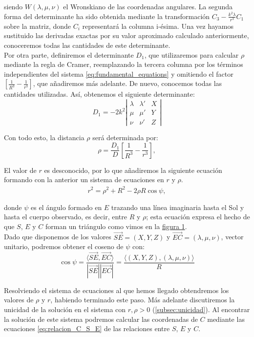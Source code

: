 \documentclass[11pt]{article}
\begin{document}
\noindent siendo $W(\lambda,\mu,\nu)$ el Wronskiano de las coordenadas angulares. La segunda forma del determinante ha sido obtenida mediante la transformación $C_3-\frac{k^2\lambda}{r^3}C_1$ sobre la matriz, donde $C_i$ representará la columna i-ésima. Una vez hayamos sustituido las derivadas exactas por su valor aproximado calculado anteriormente, conoceremos todas las cantidades de este determinante.\\

Por otra parte, definiremos el determinante $D_1$, que utilizaremos para calcular $\rho$ mediante la regla de Cramer, reemplazando la tercera columna por los términos independientes del sistema \eqref{eq:fundamental_equations} y omitiendo el factor $[\frac{1}{R^3}-\frac{1}{r^3}]$, que añadiremos más adelante. De nuevo, conocemos todas las cantidades utilizadas. Así, obtenemos el siguiente determinante:
\[
D_1 = -2k^2
\left|
\begin{array}{ccc}
\lambda & \lambda' & X\\
\mu & \mu' & Y\\
\nu & \nu' & Z
\end{array}
\right|
\]

Con todo esto, la distancia $\rho$ será determinada por:
\[
\rho = \frac{D_1}{D}[\frac{1}{R^3}-\frac{1}{r^3}],
\]

El valor de $r$ es desconocido, por lo que añadiremos la siguiente ecuación formando con la anterior un sistema de ecuaciones en $r$ y $\rho$.
\begin{align}
r^2=\rho^2+R^2-2\rho R\cos\psi,
\label{eq:triangle_relations_1}
\end{align}

\noindent donde $\psi$ es el ángulo formado en $E$ trazando una línea imaginaria hasta el Sol y hasta el cuerpo observado, es decir, entre $R$ y $\rho$; esta ecuación expresa el hecho de que $S$, $E$ y $C$ forman un triángulo como vimos en la \hyperref[figure:1]{figura 1}.\\

Dado que disponemos de los valores $\overrightarrow{SE}=(X,Y,Z)$ y $\overrightarrow{EC}=(\lambda,\mu,\nu)$, vector unitario, podremos obtener el coseno de $\psi$ con:
\[
\cos{\psi}=\frac{\langle\overrightarrow{SE},\overrightarrow{EC}\rangle}{|\overrightarrow{SE}||\overrightarrow{EC}|}=\frac{\langle(X,Y,Z),(\lambda,\mu,\nu)\rangle}{R}
\]

Resolviendo el sistema de ecuaciones al que hemos llegado obtendremos los valores de $\rho$ y $r$, habiendo terminado este paso. Más adelante discutiremos la unicidad de la solución en el sistema con $r,\rho>0$ (\ref{subsec:unicidad}). Al encontrar la solución de este sistema podremos calcular las coordenadas de $C$ mediante las ecuaciones \eqref{eq:relacion_C_S_E} de las relaciones entre $S$, $E$ y $C$.\\
\end{document}
